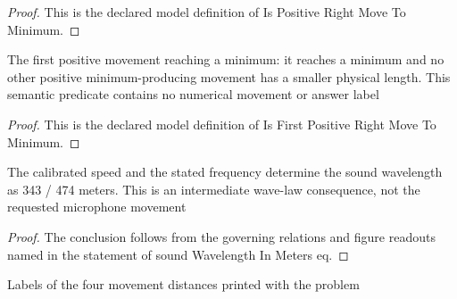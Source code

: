\begin{proof}
  This is the declared model definition of Is Positive Right Move To Minimum.
\end{proof}
\begin{definition}
  \label{def:physics:phyx-mini-0219:phyxminiproblems-problemphyxmini0219-isfirstpositiverightmovetominimum}
  The first positive movement reaching a minimum: it reaches a minimum and no other positive minimum-producing movement has a smaller physical length. This semantic predicate contains no numerical movement or answer label
\end{definition}
\begin{proof}
  This is the declared model definition of Is First Positive Right Move To Minimum.
\end{proof}
\begin{lemma}
  \label{lem:physics:phyx-mini-0219:phyxminiproblems-problemphyxmini0219-soundwavelengthinmeters-eq}
  The calibrated speed and the stated frequency determine the sound wavelength as 343 / 474 meters. This is an intermediate wave-law consequence, not the requested microphone movement
\end{lemma}
\begin{proof}
  The conclusion follows from the governing relations and figure readouts named in the statement of sound Wavelength In Meters eq.
\end{proof}
\begin{definition}
  \label{def:physics:phyx-mini-0219:phyxminiproblems-problemphyxmini0219-answerchoice}
  Labels of the four movement distances printed with the problem
\end{definition}
